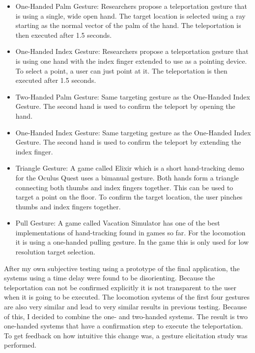 \begin{itemize}
    \item One-Handed Palm Gesture: %
    Researchers propose a teleportation gesture that is using a single, wide open hand. The target location is selected using a ray starting as the normal vector of the palm of the hand. The teleportation is then executed after 1.5 seconds.

    \item One-Handed Index Gesture: %
    Researchers propose a teleportation gesture that is using one hand with the index finger extended to use as a pointing device. To select a point, a user can just point at it. The teleportation is then executed after 1.5 seconds.
    
    \item Two-Handed Palm Gesture: %
    Same targeting gesture as the One-Handed Index Gesture. The second hand is used to confirm the teleport by opening the hand.

    \item One-Handed Index Gesture: %
    Same targeting gesture as the One-Handed Index Gesture. The second hand is used to confirm the teleport by extending the index finger.

    \item Triangle Gesture: %
    A game called Elixir which is a short hand-tracking demo for the Oculus Quest uses a bimanual gesture. Both hands form a triangle connecting both thumbs and index fingers together. This can be used to target a point on the floor. To confirm the target location, the user pinches thumbs and index fingers together.
    
    \item Pull Gesture: %
    A game called Vacation Simulator has one of the best implementations of hand-tracking found in games so far. For the locomotion it is using a one-handed pulling gesture. In the game this is only used for low resolution target selection.
\end{itemize}

After my own subjective testing using a prototype of the final application, the systems using a time delay were found to be disorienting. Because the teleportation can not be confirmed explicitly it is not transparent to the user when it is going to be executed. The locomotion systems of the first four gestures are also very similar and lead to very similar results in previous testing. Because of this, I decided to combine the one- and two-handed systems. The result is two one-handed systems that have a confirmation step to execute the teleportation. To get feedback on how intuitive this change was, a gesture elicitation study was performed. 

